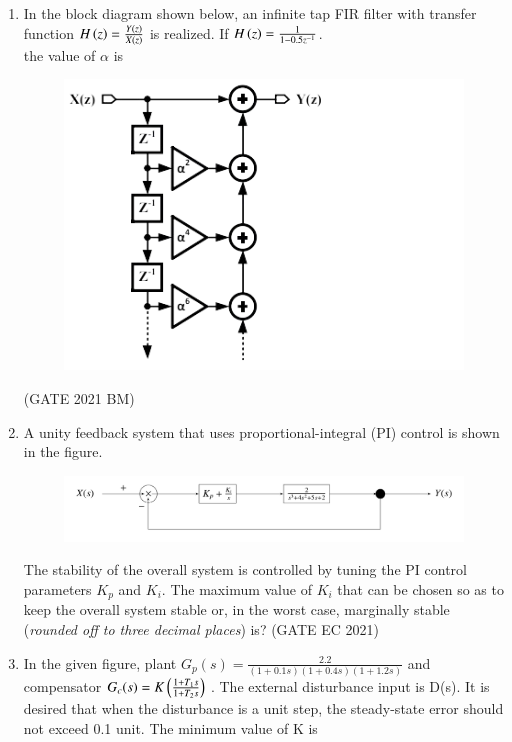 \begin{enumerate}[label=\thechapter.\arabic*,ref=\thechapter.\theenumi]
\item In the block diagram shown below, an infinite tap FIR filter with transfer function $H\left(z\right)=\frac{Y\left(z\right)}{X\left(z\right)}$ is realized. If $H\left(z\right)=\frac{1}{1-0.5z^{-1}}$.\\the value of $\alpha$ is
\begin{figure}[h]
    \includegraphics[width=1\columnwidth]{2021/BM/31/figs/questionfig.png}
    \label{fig:question31bm}
\end{figure} \hfill(GATE 2021 BM)\\
\solution

\pagebreak
\item A unity feedback system that uses proportional-integral (PI) control is shown in the figure.
 \begin{figure}[!ht]    
    \centering
\graphicspath{ {2021/EC/48/figs} }
\includegraphics[width=\columnwidth]{figure_1}
\label{figure:ee25-gate4-graph}
\end{figure}
The stability of the overall system is controlled by tuning the PI control parameters $K_p$ and $K_i$. The maximum value of $K_i$ that can be chosen so as to keep the overall system stable or, in the worst case, marginally stable (\textit{rounded off to three decimal places}) is?
\hfill{(GATE EC 2021)}\\
\solution

\pagebreak
\item In the given figure, plant $G_p(s)=\frac{2.2}{(1+0.1s)(1+0.4s)(1+1.2s)}$ and compensator $G_c(s)=K\left(\frac{1+T_1s}{1+T_2s}\right)$ . The external disturbance input is D(s). It is desired that when the disturbance is a unit step, the steady-state error should not exceed 0.1 unit. The minimum value of K is 

\end{enumerate}
